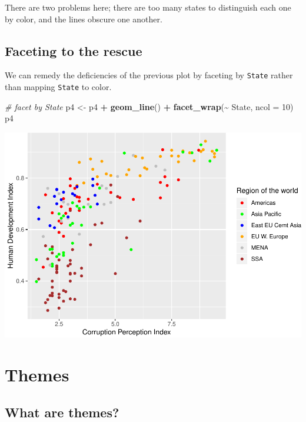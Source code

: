 \documentclass[
]{book}
\newenvironment{Shaded}{\begin{snugshade}}{\end{snugshade}}
\newcommand{\CommentTok}[1]{\textcolor[rgb]{0.56,0.35,0.01}{\textit{#1}}}
\newcommand{\DataTypeTok}[1]{\textcolor[rgb]{0.13,0.29,0.53}{#1}}
\newcommand{\DecValTok}[1]{\textcolor[rgb]{0.00,0.00,0.81}{#1}}
\newcommand{\KeywordTok}[1]{\textcolor[rgb]{0.13,0.29,0.53}{\textbf{#1}}}
\newcommand{\NormalTok}[1]{#1}
\newcommand{\OperatorTok}[1]{\textcolor[rgb]{0.81,0.36,0.00}{\textbf{#1}}}
\newcommand{\StringTok}[1]{\textcolor[rgb]{0.31,0.60,0.02}{#1}}
\begin{document}
There are two problems here; there are too many states to distinguish each one by color, and the lines obscure one another.

\hypertarget{faceting-to-the-rescue}{%
\subsection{Faceting to the rescue}\label{faceting-to-the-rescue}}

We can remedy the deficiencies of the previous plot by faceting by \texttt{State} rather than mapping \texttt{State} to color.

\begin{Shaded}
\begin{Highlighting}[]
\CommentTok{\# facet by \textasciigrave{}State\textasciigrave{}}
\NormalTok{p4 \textless{}{-}}\StringTok{ }\NormalTok{p4 }\OperatorTok{+}\StringTok{ }\KeywordTok{geom\_line}\NormalTok{() }\OperatorTok{+}
\StringTok{   }\KeywordTok{facet\_wrap}\NormalTok{(}\OperatorTok{\textasciitilde{}}\StringTok{ }\NormalTok{State, }\DataTypeTok{ncol =} \DecValTok{10}\NormalTok{)}
\NormalTok{p4}
\end{Highlighting}
\end{Shaded}

\includegraphics{R/Rgraphics/figures/unnamed-chunk-209-1.pdf}

\hypertarget{themes}{%
\section{Themes}\label{themes}}

\hypertarget{what-are-themes}{%
\subsection{What are themes?}\label{what-are-themes}}
\end{document}
